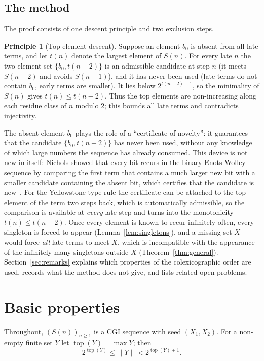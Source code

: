 \documentclass[11pt]{amsart}
\theoremstyle{definition}
\newtheorem{principle}[lemma]{Principle}
\theoremstyle{remark}
\newcommand{\topel}{\operatorname{top}}
\begin{document}
\subsection{The method}
The proof consists of one descent principle and two exclusion steps.

\begin{principle}[Top-element descent]\label{pr:descent}
Suppose an element $b_0$ is absent from all late terms, and let $t(n)$ denote the largest
element of $S(n)$. For every late $n$ the two-element set $\{b_0,t(n-2)\}$ is an admissible
candidate at step $n$ (it meets $S(n-2)$ and avoids $S(n-1)$), and it has never been used (late
terms do not contain $b_0$, early terms are smaller). It lies below $2^{t(n-2)+1}$, so the
minimality of $S(n)$ gives $t(n)\le t(n-2)$. Thus the top elements are non-increasing along each
residue class of $n$ modulo $2$; this bounds all late terms and contradicts injectivity.
\end{principle}

The absent element $b_0$ plays the role of a ``certificate of novelty'': it guarantees that the
candidate $\{b_0,t(n-2)\}$ has never been used, without any knowledge of which large numbers the
sequence has already consumed. This device is not new in itself: Nichols showed that every bit
recurs in the binary Enots Wolley sequence by comparing the first term that contains a much
larger new bit with a smaller candidate containing the absent bit, which certifies that the
candidate is new~\cite[Lemma~1]{Nichols22}. For the Yellowstone-type rule the certificate can be
attached to the top element of the term two steps back, which is automatically admissible, so
the comparison is available at \emph{every} late step and turns into the monotonicity
$t(n)\le t(n-2)$. Once every element is known to recur infinitely often, every
singleton is forced to appear (Lemma~\ref{lem:singletons}), and a missing set $X$ would force
\emph{all} late terms to meet $X$, which is incompatible with the appearance of the infinitely
many singletons outside $X$ (Theorem~\ref{thm:general}). Section~\ref{sec:remarks} explains which
properties of the colexicographic order are used, records what the method does not give, and
lists related open problems.

\section{Basic properties}\label{sec:basic}

Throughout, $(S(n))_{n\ge1}$ is a CGI sequence with seed $(X_1,X_2)$. For a non-empty finite
set $Y$ let $\topel(Y)=\max Y$; then
\begin{equation}\label{eq:topbound}
2^{\topel(Y)}\le\|Y\|<2^{\topel(Y)+1}.
\end{equation}
\end{document}
